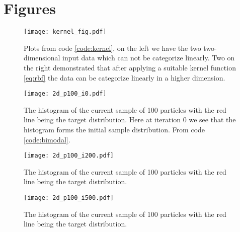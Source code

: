 \documentclass[11pt]{isr} %
\begin{document}
\newpage






\newpage

\appendix
\section{Figures}

\begin{figure}[ht]
\begin{center}
\texttt{[image: kernel\_fig.pdf]}
\caption{Plots from code \ref{code:kernel}, on the left we have the two two-dimensional input data which can not be categorize linearly. Two on the right demonstrated that after applying a suitable kernel function \ref{eq:rbf} the data can be categorize linearly in a higher dimension.}
\label{fig:kernel}
\end{center}
\end{figure}

\begin{figure}[ht]
\begin{center}
\texttt{[image: 2d\_p100\_i0.pdf]}
\caption{The histogram of the current sample of 100 particles with the red line being the target distribution. Here at iteration 0 we see that the histogram forms the initial sample distribution. From code \ref{code:bimodal}.}
\label{fig:bimodal_it0}
\end{center}
\end{figure}

\begin{figure}[ht]
\begin{center}
\texttt{[image: 2d\_p100\_i200.pdf]}
\caption{The histogram of the current sample of 100 particles with the red line being the target distribution.}
\label{fig:bimodal_it200}
\end{center}
\end{figure}

\begin{figure}[ht]
\begin{center}
\texttt{[image: 2d\_p100\_i500.pdf]}
\caption{The histogram of the current sample of 100 particles with the red line being the target distribution.}
\label{fig:bimodal_it500}
\end{center}
\end{figure}
\end{document}
